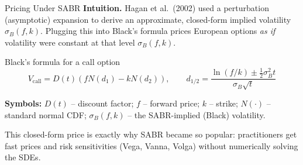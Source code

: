 \documentclass[aspectratio=169,10pt]{beamer}
\begin{document}
\begin{frame}{Pricing Under SABR}
  \textbf{Intuition.} Hagan et al.\ (2002) used a perturbation (asymptotic)
  expansion to derive an approximate, closed-form implied volatility
  $\sigma_B(f,k)$. Plugging this into Black's formula prices European options
  \emph{as if} volatility were constant at that level $\sigma_B(f,k)$.

  \begin{block}{Black's formula for a call option}
  \begin{equation}
    V_{\text{call}} = D(t)\left(f N(d_1) - k N(d_2)\right), \qquad
    d_{1/2} = \frac{\ln(f/k) \pm \tfrac{1}{2}\sigma_B^2 t}{\sigma_B \sqrt{t}}
  \end{equation}
  \end{block}
  \textbf{Symbols:} $D(t)$ -- discount factor; $f$ -- forward price; $k$ -- strike;
  $N(\cdot)$ -- standard normal CDF; $\sigma_B(f,k)$ -- the SABR-implied (Black) volatility.

  \vspace{2mm}
  This closed-form price is exactly why SABR became so popular: practitioners
  get fast prices and risk sensitivities (Vega, Vanna, Volga) without numerically
  solving the SDEs.
\end{frame}
\end{document}
